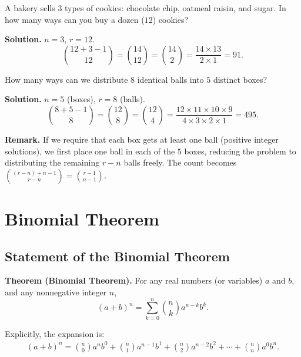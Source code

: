 \documentclass[11pt,a4paper]{article}
\begin{document}
\begin{example}
A bakery sells $3$ types of cookies: chocolate chip, oatmeal raisin, and sugar. In how many ways can you buy a dozen ($12$) cookies?

\textbf{Solution.} $n = 3$, $r = 12$.
\begin{equation*}
    \binom{12 + 3 - 1}{12} = \binom{14}{12} = \binom{14}{2} = \frac{14 \times 13}{2 \times 1} = 91.
\end{equation*}
\end{example}

\begin{example}
How many ways can we distribute $8$ identical balls into $5$ distinct boxes?

\textbf{Solution.} $n = 5$ (boxes), $r = 8$ (balls).
\begin{equation*}
    \binom{8 + 5 - 1}{8} = \binom{12}{8} = \binom{12}{4} = \frac{12 \times 11 \times 10 \times 9}{4 \times 3 \times 2 \times 1} = 495.
\end{equation*}
\end{example}

\textbf{Remark.} If we require that each box gets at least one ball (positive integer solutions), we first place one ball in each of the $5$ boxes, reducing the problem to distributing the remaining $r - n$ balls freely. The count becomes $\binom{(r-n) + n - 1}{r-n} = \binom{r-1}{n-1}$.

\section{Binomial Theorem}

\subsection{Statement of the Binomial Theorem}

\textbf{Theorem (Binomial Theorem).} For any real numbers (or variables) $a$ and $b$, and any nonnegative integer $n$,
\begin{equation*}
    (a + b)^n = \sum_{k=0}^{n} \binom{n}{k} a^{n-k} b^{k}.
\end{equation*}

Explicitly, the expansion is:
\begin{align*}
    (a + b)^n = \binom{n}{0} a^n b^0 + \binom{n}{1} a^{n-1} b^1 + \binom{n}{2} a^{n-2} b^2 + \cdots + \binom{n}{n} a^0 b^n.
\end{align*}
\end{document}
